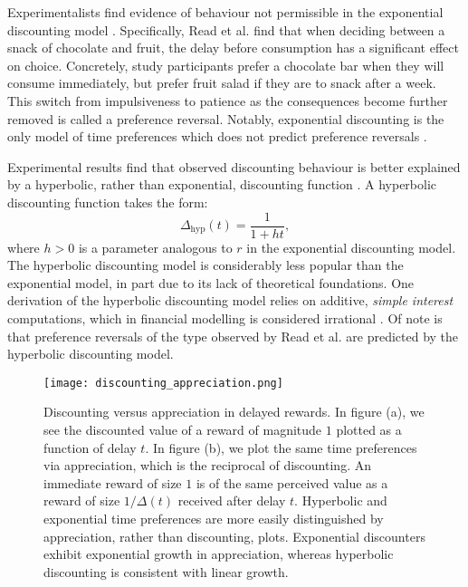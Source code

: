 \documentclass[titlepage, hidelinks, 12pt]{article}
\theoremstyle{plain}
\theoremstyle{remark}
\theoremstyle{definition}
\DeclareMathOperator{\hyp}{hyp}
\begin{document}
Experimentalists find evidence of behaviour not permissible in the exponential discounting model \cite{read98}. 
Specifically, Read et al. find that
when deciding between a snack of chocolate and fruit, the delay before consumption has a significant effect on choice. Concretely, study participants
prefer a chocolate bar
when they will consume immediately, but prefer fruit salad if they are to snack after a week. This switch from impulsiveness to patience as
the consequences become further removed is called a preference reversal. 
Notably, exponential discounting is the only model of time preferences which does not predict preference reversals
\cite{strotz55}. 


Experimental results find that observed discounting behaviour is better explained
by a hyperbolic, rather than exponential, discounting function \cite{maia09, green04, doyle12}. A hyperbolic discounting function takes
the form:
\begin{equation}
    \Delta_{\hyp}(t) = \frac{1}{1+ht},
\end{equation}
where $h>0$ is a parameter analogous to $r$ in the exponential discounting model. The hyperbolic discounting model is considerably less
popular than the exponential model, in part due to its lack of theoretical foundations. One derivation of the hyperbolic discounting model relies
on additive, \textit{simple interest} computations, which in financial modelling is considered irrational \cite{rachlin06}. Of note is
that preference reversals of the type observed by Read et al. are predicted by the hyperbolic discounting model. 


\begin{figure}[H]
    \centering
    \texttt{[image: discounting\_appreciation.png]}
    \caption[Example discounting and corresponding appreciation schedules.]{Discounting versus appreciation in delayed rewards. 
        In figure (a), we see the discounted value of a reward of magnitude $1$ plotted as a function of delay $t$. In figure 
        (b), we plot the same time preferences via appreciation, which is the reciprocal of discounting. An immediate reward of size $1$ is
        of the same perceived value as a reward of size $1/\Delta(t)$ received after delay $t$. 
        Hyperbolic and exponential time preferences are more easily distinguished by appreciation, rather than discounting, plots.
Exponential discounters exhibit exponential
        growth in appreciation, whereas hyperbolic discounting is consistent with linear growth.}
\end{figure}
\end{document}

